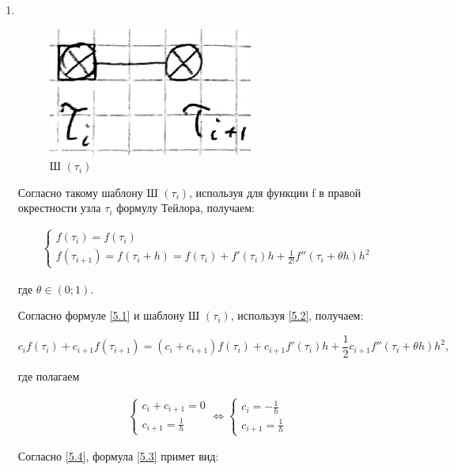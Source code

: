 \documentclass[__main__.tex]{subfiles}
\begin{document}
\begin{enumerate}
	
	\item $ $
	\begin{figure}[h!]
		\centering
		\includegraphics[width=0.1\linewidth]{img/img_5.2}
		\caption{Ш $\left( \tau_i \right)$}
		\label{img_5.2}
	\end{figure}

	Согласно такому шаблону Ш $\left( \tau_i \right)$, используя для функции f в правой окрестности узла $\tau_i$ формулу Тейлора, получаем:
	
	\begin{gather}\label{5.2}
	\begin{cases}
	f \left( \tau_i \right) = f \left( \tau_i \right) \\
	f \left( \tau_{i+1} \right) = f \left( \tau_i + h \right) = f\left( \tau_i \right) + f'\left( \tau_i \right) h + \frac{1}{2!} f''\left(\tau_i + \theta h\right) h^2
	\end{cases}
	\end{gather}
	
	где $\theta \in \left( 0; 1 \right)$.
	
	Согласно формуле \ref{5.1} и шаблону Ш $\left( \tau_i \right)$, используя \ref{5.2}, получаем: 
	
	\begin{equation}\label{5.3}
	c_i f\left( \tau_i \right) + c_{i+1} f \left( \tau_{i+1} \right) = \left( c_i + c_{i+1} \right) f \left( \tau_i \right) + c_{i+1} f' \left( \tau_i \right) h + \frac{1}{2} c_{i+1} f''\left(\tau_i + \theta h\right)h^2,
	\end{equation}
		
	где полагаем
	
	\begin{gather}\label{5.4}
	\begin{cases}
	c_i + c_{i+1} = 0 \\
	c_{i+1} = \frac{1}{h}
	\end{cases}
	\Leftrightarrow
	\begin{cases}
	c_i = - \frac{1}{h} \\
	c_{i+1} = \frac{1}{h}
	\end{cases}
	\end{gather}
	
	Согласно \ref{5.4}, формула \ref{5.3} примет вид:
	

\end{enumerate}
\end{document}
